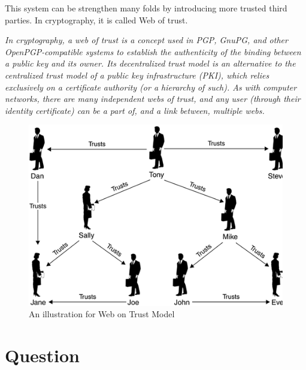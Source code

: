 \documentclass{article}
\begin{document}
This system can be strengthen many folds by introducing more trusted third parties. In cryptography, it is called Web of trust.

\newpage
\textit{
    In cryptography, a web of trust is a concept used in PGP, GnuPG, and other OpenPGP-compatible systems to establish the authenticity of the binding between a public key and its owner. Its decentralized trust model is an alternative to the centralized trust model of a public key infrastructure (PKI), which relies exclusively on a certificate authority (or a hierarchy of such). As with computer networks, there are many independent webs of trust, and any user (through their identity certificate) can be a part of, and a link between, multiple webs. 
}\citep{wot_wiki}

\begin{figure}[h]
\centering
\includegraphics[scale=0.5]{wot.png}
\caption{An illustration for Web on Trust Model \citep{butebanwot}}
\label{fig:wot}
\end{figure}



\section{Question}
\end{document}
